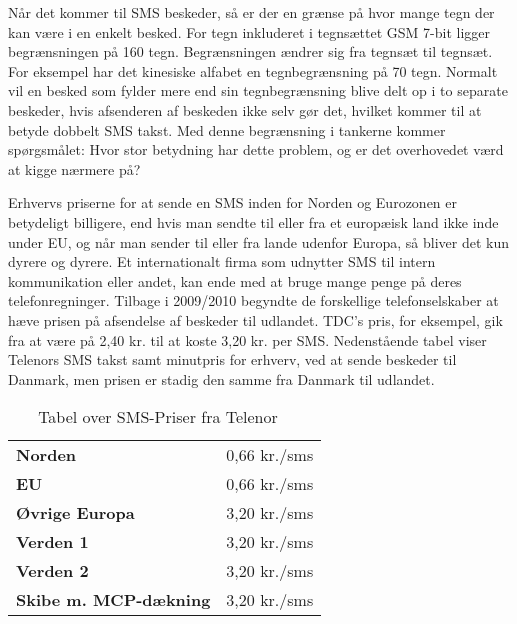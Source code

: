 Når det kommer til SMS beskeder, så er der en grænse på hvor mange tegn der kan være i en enkelt besked. For tegn inkluderet i tegnsættet GSM 7-bit ligger begrænsningen på 160 tegn. Begrænsningen ændrer sig fra tegnsæt til tegnsæt. For eksempel har det kinesiske alfabet en tegnbegrænsning på 70 tegn\cite{Pro_1}. Normalt vil en besked som fylder mere end sin tegnbegrænsning blive delt op i to separate beskeder, hvis afsenderen af beskeden ikke selv gør det, hvilket kommer til at betyde dobbelt SMS takst. Med denne begrænsning i tankerne kommer spørgsmålet: Hvor stor betydning har dette problem, og er det overhovedet værd at kigge nærmere på? 

Erhvervs priserne for at sende en SMS inden for Norden og Eurozonen er betydeligt billigere, end hvis man sendte til eller fra et europæisk land ikke inde under EU, og når man sender til eller fra lande udenfor Europa, så bliver det kun dyrere og dyrere. Et internationalt firma som udnytter SMS til intern kommunikation eller andet, kan ende med at bruge mange penge på deres telefonregninger. Tilbage i 2009/2010 begyndte de forskellige telefonselskaber at hæve prisen på afsendelse af beskeder til udlandet. TDC's pris, for eksempel, gik fra at være på 2,40 kr. til at koste 3,20 kr. per SMS\cite{Pro_2}. Nedenstående tabel viser Telenors SMS takst samt minutpris for erhverv, ved at sende beskeder til Danmark, men prisen er stadig den samme fra Danmark til udlandet\cite{Pro_3_1}.

\begin{table}[H]
\begin{center}
\begin{tabular}{ | l | r |}
    \hline
    \cellcolor{ForestGreen} &  \cellcolor{ForestGreen}\color{white}{\textbf{Sende/Modtage SMS}}\\[2ex] \hline
    \textbf{Norden} & 0,66 kr./sms \\ \hline
    \textbf{EU} & 0,66 kr./sms \\ \hline
    \textbf{Øvrige Europa} & 3,20 kr./sms \\ \hline
    \textbf{Verden 1} & 3,20 kr./sms \\ \hline
    \textbf{Verden 2} & 3,20 kr./sms \\ \hline
    \textbf{Skibe m. MCP-dækning} & 3,20 kr./sms \\ \hline
\end{tabular} 
\caption{Tabel over SMS-Priser fra Telenor ~\cite{Pro_3_2}}
\end{center}
\end{table}

